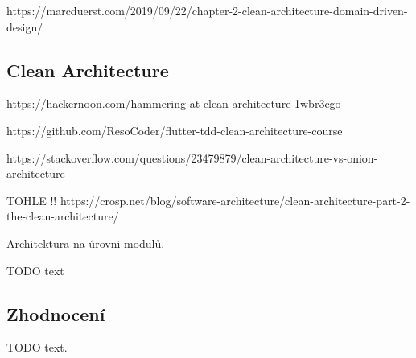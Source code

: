 https://marcduerst.com/2019/09/22/chapter-2-clean-architecture-domain-driven-design/

\subsection{Clean Architecture}

https://hackernoon.com/hammering-at-clean-architecture-1wbr3cgo

https://github.com/ResoCoder/flutter-tdd-clean-architecture-course

https://stackoverflow.com/questions/23479879/clean-architecture-vs-onion-architecture

TOHLE !! https://crosp.net/blog/software-architecture/clean-architecture-part-2-the-clean-architecture/

Architektura na úrovni modulů.

TODO text









\subsection{Zhodnocení}

TODO text.
